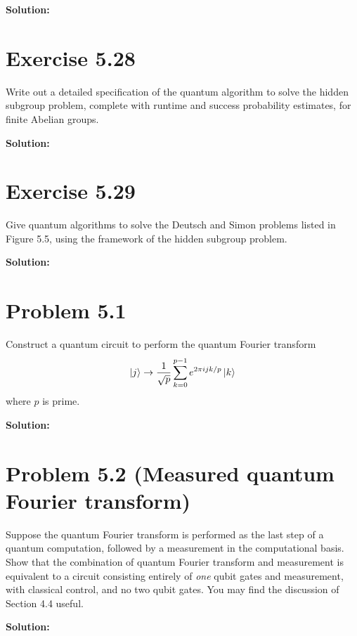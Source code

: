 \documentclass{book}
\begin{document}
    \textbf{Solution:}

\section*{Exercise 5.28}
    Write out a detailed specification of the quantum algorithm to solve the hidden subgroup problem, complete with runtime and success probability estimates, for finite Abelian groups.
    
    \textbf{Solution:}
    
\section*{Exercise 5.29}
    Give quantum algorithms to solve the Deutsch and Simon problems listed in Figure 5.5, using the framework of the hidden subgroup problem.
    
    \textbf{Solution:}

\section*{Problem 5.1}
    Construct a quantum circuit to perform the quantum Fourier transform
    \begin{align}
        \ket{j} \rightarrow \frac{1}{\sqrt{p}} \sum_{k=0}^{p-1} e^{2\pi ijk/p} \ket{k}
    \end{align}
    where $p$ is prime.
    
    \textbf{Solution:}

\section*{Problem 5.2 (Measured quantum Fourier transform)}
    Suppose the quantum Fourier transform is performed as the last step of a quantum computation, followed by a measurement in the computational basis. Show that the combination of quantum Fourier transform and measurement is equivalent to a circuit consisting entirely of \emph{one} qubit gates and measurement, with classical control, and no two qubit gates. You may find the discussion of Section 4.4 useful.
    
    \textbf{Solution:}
\end{document}
